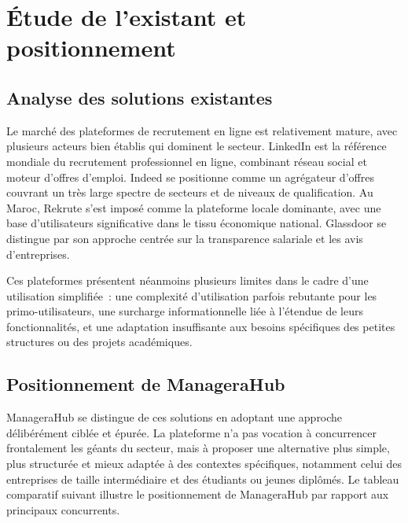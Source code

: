 \documentclass[12pt,a4paper]{report}
\begin{document}
\section{Étude de l'existant et positionnement}

\subsection{Analyse des solutions existantes}

Le marché des plateformes de recrutement en ligne est relativement mature, avec plusieurs acteurs bien établis qui dominent le secteur. LinkedIn est la référence mondiale du recrutement professionnel en ligne, combinant réseau social et moteur d'offres d'emploi. Indeed se positionne comme un agrégateur d'offres couvrant un très large spectre de secteurs et de niveaux de qualification. Au Maroc, Rekrute s'est imposé comme la plateforme locale dominante, avec une base d'utilisateurs significative dans le tissu économique national. Glassdoor se distingue par son approche centrée sur la transparence salariale et les avis d'entreprises.

Ces plateformes présentent néanmoins plusieurs limites dans le cadre d'une utilisation simplifiée~: une complexité d'utilisation parfois rebutante pour les primo-utilisateurs, une surcharge informationnelle liée à l'étendue de leurs fonctionnalités, et une adaptation insuffisante aux besoins spécifiques des petites structures ou des projets académiques.

\subsection{Positionnement de ManageraHub}

ManageraHub se distingue de ces solutions en adoptant une approche délibérément ciblée et épurée. La plateforme n'a pas vocation à concurrencer frontalement les géants du secteur, mais à proposer une alternative plus simple, plus structurée et mieux adaptée à des contextes spécifiques, notamment celui des entreprises de taille intermédiaire et des étudiants ou jeunes diplômés. Le tableau comparatif suivant illustre le positionnement de ManageraHub par rapport aux principaux concurrents.
\end{document}
